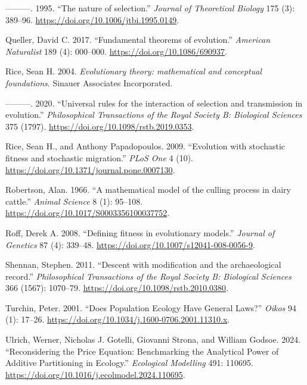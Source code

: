\documentclass[
]{article}
\newlength{\cslhangindent}
\newlength{\cslentryspacingunit} %
\newenvironment{CSLReferences}[2] %
 {%
  \setlength{\parindent}{0pt}
  \ifodd #1
  \let\oldpar\par
  \def\par{\hangindent=\cslhangindent\oldpar}
  \fi
  \setlength{\parskip}{#2\cslentryspacingunit}
 }%
 {}
\begin{document}
\begin{CSLReferences}{1}{0}
\leavevmode{}%
---------. 1995. {``{The nature of selection}.''} \emph{Journal of
Theoretical Biology} 175 (3): 389--96.
\url{https://doi.org/10.1006/jtbi.1995.0149}.

\leavevmode{}%
Queller, David C. 2017. {``{Fundamental theorems of evolution}.''}
\emph{American Naturalist} 189 (4): 000--000.
\url{https://doi.org/10.1086/690937}.

\leavevmode{}%
Rice, Sean H. 2004. \emph{{Evolutionary theory: mathematical and
conceptual foundations}}. Sinauer Associates Incorporated.

\leavevmode{}%
---------. 2020. {``{Universal rules for the interaction of selection
and transmission in evolution}.''} \emph{Philosophical Transactions of
the Royal Society B: Biological Sciences} 375 (1797).
\url{https://doi.org/10.1098/rstb.2019.0353}.

\leavevmode{}%
Rice, Sean H., and Anthony Papadopoulos. 2009. {``{Evolution with
stochastic fitness and stochastic migration}.''} \emph{PLoS One} 4 (10).
\url{https://doi.org/10.1371/journal.pone.0007130}.

\leavevmode{}%
Robertson, Alan. 1966. {``{A mathematical model of the culling process
in dairy cattle}.''} \emph{Animal Science} 8 (1): 95--108.
\url{https://doi.org/10.1017/S0003356100037752}.

\leavevmode{}%
Roff, Derek A. 2008. {``{Defining fitness in evolutionary models}.''}
\emph{Journal of Genetics} 87 (4): 339--48.
\url{https://doi.org/10.1007/s12041-008-0056-9}.

\leavevmode{}%
Shennan, Stephen. 2011. {``{Descent with modification and the
archaeological record}.''} \emph{Philosophical Transactions of the Royal
Society B: Biological Sciences} 366 (1567): 1070--79.
\url{https://doi.org/10.1098/rstb.2010.0380}.

\leavevmode{}%
Turchin, Peter. 2001. {``Does Population Ecology Have General Laws?''}
\emph{Oikos} 94 (1): 17--26.
\url{https://doi.org/10.1034/j.1600-0706.2001.11310.x}.

\leavevmode{}%
Ulrich, Werner, Nicholas J. Gotelli, Giovanni Strona, and William
Godsoe. 2024. {``Reconsidering the Price Equation: Benchmarking the
Analytical Power of Additive Partitioning in Ecology.''}
\emph{Ecological Modelling} 491: 110695.
\url{https://doi.org/10.1016/j.ecolmodel.2024.110695}.


\end{CSLReferences}
\end{document}
